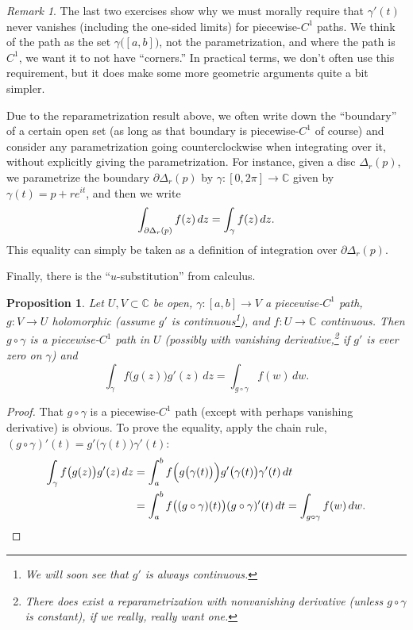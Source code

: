 \documentclass[12pt,openany]{book}
\newcommand{\glsadd}[2][]{}
\newcommand{\avoidbreak}{\postdisplaypenalty=100}
\newcommand{\C}{{\mathbb{C}}}
\newcommand{\myquote}[1]{``#1''}
\theoremstyle{plain}
\newtheorem{prop}[thm]{Proposition}
\theoremstyle{remark}
\newtheorem{remark}[thm]{Remark}
\theoremstyle{definition}
\theoremstyle{exercise}
\theoremstyle{example}
\begin{document}
\begin{remark}
The last two exercises show why we must morally
require that $\gamma'(t)$ never vanishes (including the one-sided limits)
for piecewise-$C^1$ paths.
We think of the path
as the set
$\gamma\bigl([a,b]\bigr)$,
not the parametrization, and where the path is $C^1$,
we want it to not have \myquote{corners.}
In practical terms, we don't often use this requirement,
but it does make some more geometric arguments quite a bit simpler.
\end{remark}

Due to the reparametrization result above,
we often write down the \myquote{boundary} of a certain open set
(as long as that boundary is piecewise-$C^1$ of course)
and consider any parametrization going counterclockwise
when integrating over it, without explicitly giving the parametrization.
For instance, given a disc $\Delta_r(p)$, we parametrize
the boundary $\partial \Delta_r(p)$ by
$\gamma  \colon [0,2\pi] \to \C$ given by $\gamma(t) = p +
re^{it}$, and then we write
\glsadd{not:boundaryascycle}%
\begin{equation*}
\int_{\partial \Delta_r(p)} f(z) \, dz
=
\int_{\gamma} f(z) \, dz .
\avoidbreak
\end{equation*}
This equality can simply be taken as a definition of integration over
$\partial \Delta_r(p)$.

Finally, there is the \myquote{$u$-substitution} from calculus.

\begin{prop} \label{prop:usubst}
Let $U,V \subset \C$ be open, $\gamma \colon [a,b] \to V$ 
a piecewise-$C^1$ path, $g \colon V \to U$ holomorphic (assume $g'$ is
continuous\footnote{We will soon see that $g'$ is always continuous.}), and $f \colon U \to \C$
continuous.  Then $g \circ \gamma$ is a piecewise-$C^1$ path in $U$
(possibly with vanishing derivative,\footnote{%
There does exist a reparametrization with nonvanishing derivative
(unless $g \circ \gamma$ is constant), if we really,
really want one.}
if $g'$ is ever zero on $\gamma$) and
\begin{equation*}
\int_{\gamma} f\bigl(g(z)\bigr) g'(z) \, dz
=
\int_{g \circ \gamma} f(w) \, dw .
\end{equation*}
\end{prop}

\begin{proof}
That $g \circ \gamma$ is a piecewise-$C^1$ path (except with perhaps
vanishing derivative) is obvious.  To prove the equality,
apply the chain rule,
$(g \circ \gamma)'(t) = g'\bigl(\gamma(t)\bigr) \gamma'(t)$:
\begin{equation*}
\begin{split}
\int_{\gamma} f\bigl(g(z)\bigr) g'(z) \, dz
& =
\int_a^b
f\Bigl(g\bigl(\gamma(t)\bigr)\Bigr) g'\bigl(\gamma(t)\bigr) \gamma'(t) \, dt
\\
& =
\int_a^b
f\bigl((g \circ \gamma)(t)\bigr) (g \circ \gamma)'(t) \, dt
=
\int_{g \circ \gamma} f(w) \, dw . \qedhere
\end{split}
\end{equation*}
\end{proof}
\end{document}
